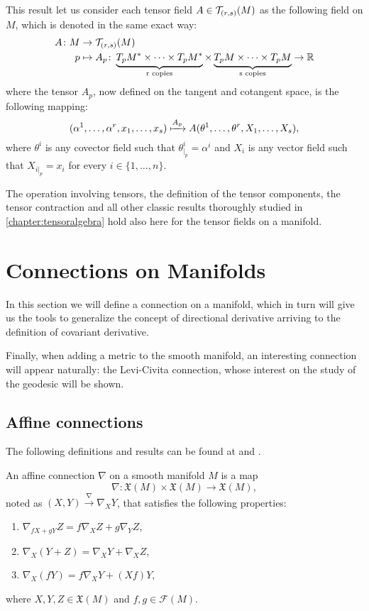 This result let us consider each tensor field $A \in {\mathcal T}_{(r,s)}(M)$ as the following field on $M$, which is denoted in the same exact way:
\begin{align*}
	A \colon M &\to {\mathcal T}_{(r,s)}(M) \\
	p &\mapsto A_p \colon \underbrace{T_p M^* \times \dots \times T_p M^*}_{\text{r copies}} \times \underbrace{T_p M \times \dots \times T_p M}_{\text{s copies}} \to \mathbb{R}
\end{align*}
where the tensor $A_p$, now defined on the tangent and cotangent space, is the following mapping:
\[
	(\alpha^1, \dots, \alpha^r, x_1, \dots, x_s) \xmapsto{A_p} A(\theta^1, \dots, \theta^r, X_1, \dots, X_s),
\]
where $\theta^i$ is any covector field such that $\theta^i_{|_p} = \alpha^i$ and $X_i$ is any vector field such that $X_{i|_p} = x_i$ for every $i \in \{1, \dots, n\}$.

The operation involving tensors, the definition of the tensor components, the tensor contraction and all other classic results thoroughly studied in \autoref{chapter:tensoralgebra}  hold also here for the tensor fields on a manifold.

\section{Connections on Manifolds}

In this section we will define a connection on a manifold, which in turn will give us the tools to generalize the concept of directional derivative arriving to the definition of covariant derivative.

Finally, when adding a metric to the smooth manifold, an interesting connection will appear naturally: the Levi-Civita connection, whose interest on the study of the geodesic will be shown.

\subsection{Affine connections}

The following definitions and results can be found at \cite[Ch. 2, Section 2]{docarmo79} and \cite[pp. 59-67]{oneill83}.

\begin{definition}
	\label{def:affineconnection}
	An affine connection $\nabla$ on a smooth manifold $M$ is a map
	\[
		\nabla \colon \mathfrak{X}(M) \times \mathfrak{X}(M) \to \mathfrak{X}(M),
	\]
	noted as $(X, Y) \xrightarrow{\nabla}\nabla_X Y$, that satisfies the following properties:
	\begin{enumerate}
		\item $\nabla_{fX + gY} Z = f\nabla_X Z + g\nabla_Y Z$,
		\item $\nabla_X(Y+Z) = \nabla_X Y + \nabla_X Z$,
		\item $\nabla_X (fY) = f\nabla_XY + (Xf) Y$,
	\end{enumerate}
	where $X,Y,Z \in \mathfrak{X}(M)$ and $f,g \in \mathcal{F}(M)$.
\end{definition}

